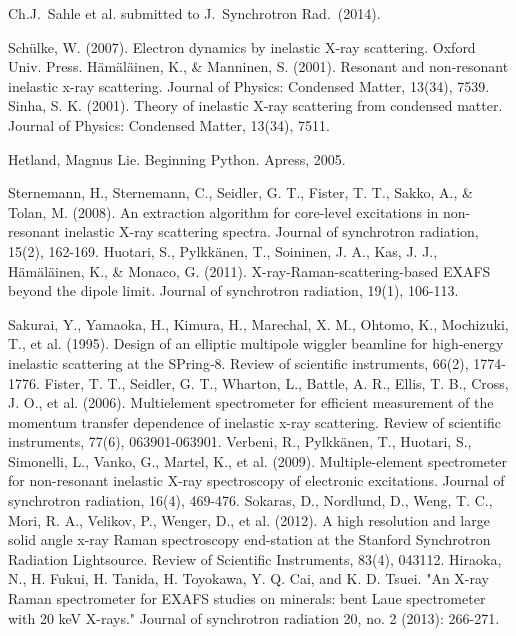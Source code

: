 \documentclass[aps,prl,groupedaddress]{revtex4}
\begin{document}

%

\begin{thebibliography}{}

 Ch.J.~Sahle et al. submitted to J.~Synchrotron Rad.~(2014). 

 Sch\"ulke, W. (2007). Electron dynamics by inelastic X-ray scattering. Oxford Univ. Press.
 H\"am\"al\"ainen, K., \& Manninen, S. (2001). Resonant and non-resonant inelastic x-ray scattering. Journal of Physics: Condensed Matter, 13(34), 7539.
 Sinha, S. K. (2001). Theory of inelastic X-ray scattering from condensed matter. Journal of Physics: Condensed Matter, 13(34), 7511.

 Hetland, Magnus Lie. Beginning Python. Apress, 2005.

 Sternemann, H., Sternemann, C., Seidler, G. T., Fister, T. T., Sakko, A., \& Tolan, M. (2008). An extraction algorithm for core-level excitations in non-resonant inelastic X-ray scattering spectra. Journal of synchrotron radiation, 15(2), 162-169.
 Huotari, S., Pylkk\"anen, T., Soininen, J. A., Kas, J. J., H\"am\"al\"ainen, K., \& Monaco, G. (2011). X-ray-Raman-scattering-based EXAFS beyond the dipole limit. Journal of synchrotron radiation, 19(1), 106-113.

 Sakurai, Y., Yamaoka, H., Kimura, H., Marechal, X. M., Ohtomo, K., Mochizuki, T., et al. (1995). Design of an elliptic multipole wiggler beamline for high‐energy inelastic scattering at the SPring‐8. Review of scientific instruments, 66(2), 1774-1776.
 Fister, T. T., Seidler, G. T., Wharton, L., Battle, A. R., Ellis, T. B., Cross, J. O., et al. (2006). Multielement spectrometer for efficient measurement of the momentum transfer dependence of inelastic x-ray scattering. Review of scientific instruments, 77(6), 063901-063901.
 Verbeni, R., Pylkk\"anen, T., Huotari, S., Simonelli, L., Vanko, G., Martel, K., et al. (2009). Multiple-element spectrometer for non-resonant inelastic X-ray spectroscopy of electronic excitations. Journal of synchrotron radiation, 16(4), 469-476.
 Sokaras, D., Nordlund, D., Weng, T. C., Mori, R. A., Velikov, P., Wenger, D., et al. (2012). A high resolution and large solid angle x-ray Raman spectroscopy end-station at the Stanford Synchrotron Radiation Lightsource. Review of Scientific Instruments, 83(4), 043112.
 Hiraoka, N., H. Fukui, H. Tanida, H. Toyokawa, Y. Q. Cai, and K. D. Tsuei. "An X-ray Raman spectrometer for EXAFS studies on minerals: bent Laue spectrometer with 20 keV X-rays." Journal of synchrotron radiation 20, no. 2 (2013): 266-271.


\end{thebibliography}
\end{document}
